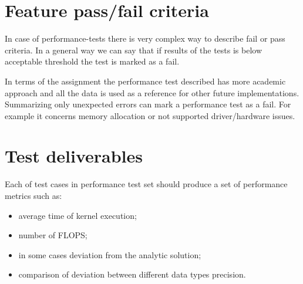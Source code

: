 \section{Feature pass/fail criteria} \label{s:details-of-the-level-test-design:feature-pass-fail-criteria}
	\begin{comment}
		Specify the criteria to be used to determine whether the feature or feature combination has passed or
		failed. This is commonly based on the number of anomalies found in each severity category(s). This
		section is not needed if it is covered by an MTP and there have been no subsequent changes to the
		criteria.
	\end{comment}
	In case of performance-tests there is very complex way to describe fail or pass criteria. In a general way we can say that if results of the tests is below acceptable threshold the test is marked as a fail. 
	
	In terms of the assignment the performance test described has more academic approach and all the data is used as a reference for other future implementations. Summarizing only unexpected errors can mark a performance test as a fail. For example it concerns memory allocation or not supported driver/hardware issues.
\section{Test deliverables} \label{s:details-of-the-level-test-design:test-deliverables}
	\begin{comment}
		Identify all information that is to be delivered by the test activity (documents, data, etc.). The following
		documents may be included:
		⎯ Level Test Plan(s)
		⎯ Level Test Design(s)
		⎯ Level Test Cases
		⎯ Level Test Procedures
		⎯ Level Test Logs
		⎯ Anomaly Reports
		⎯ Level Interim Test Status Report(s)
		⎯ Level Test Report(s)
		⎯ Master Test Report
		Test input data and test output data may be identified as deliverables. Test tools may also be included.
		If documents have been combined or eliminated, then this list will be modified accordingly.
		Describe the process of delivering the completed information to the individuals (preferably by position,
		not name) and organizational entities that will need it. This may be a reference to a Configuration
		Management Plan. This delivery process description is not required if it is covered by the MTP and
		there are no changes
	\end{comment}
	Each of test cases in performance test set should produce a set of performance metrics such as:
	\begin{itemize}
		\item average time of kernel execution;
		\item number of \gls{FLOPS};
		\item in some cases deviation from the analytic solution;
		\item comparison of deviation between different data types precision.
	\end{itemize}
